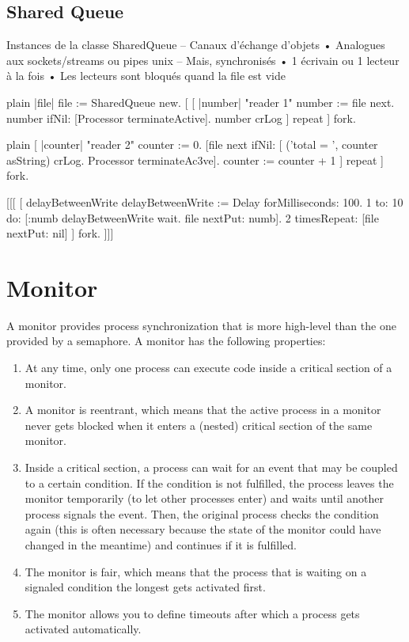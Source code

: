 \documentclass[10pt,twoside,english]{_support/latex/sbabook/sbabook}
\begin{document}
\section{Shared Queue}
Instances de la classe SharedQueue  –  Canaux d'échange d'objets 
•  Analogues aux sockets/streams ou pipes unix  –  Mais, synchronisés 
•  1 écrivain ou 1 lecteur à la fois 
•  Les lecteurs sont bloqués quand la file est vide

\begin{displaycode}{plain}
|file| 
file := SharedQueue new.
[
	[ |number| "reader 1"
	number := file next.
	number ifNil: [Processor terminateActive].
	number crLog ] repeat
	] fork. 
\end{displaycode}

\begin{displaycode}{plain}
	[ |counter| "reader 2" 
	counter := 0. 
	[file next ifNil: [ ('total = ', counter asString) crLog.
		Processor terminateAc3ve].
		counter := counter + 1 ] repeat 
	] fork.
\end{displaycode}

 {[}{[}{[}
{[}	
	\textbar{}delayBetweenWrite\textbar{}
	delayBetweenWrite := Delay forMilliseconds: 100.   
	1 to: 10 do: {[}:numb\textbar{} 
		delayBetweenWrite wait.
		file nextPut: numb{]}.
	2 timesRepeat: {[}file nextPut: nil{]}
	{]} fork. 
{]}{]}{]}
\chapter{Monitor}
A monitor provides process synchronization that is more high-level than the one provided by a semaphore. A monitor has the following properties:

\begin{enumerate}
\item At any time, only one process can execute code inside a critical section of a monitor.
\item A monitor is reentrant, which means that the active process in a monitor never gets blocked when it enters a (nested) critical section of the same monitor.
\item Inside a critical section, a process can wait for an event that may be coupled to a certain condition. If the condition is not fulfilled, the process leaves the monitor temporarily (to let other processes enter) and waits until another process signals the event. Then, the original process checks the condition again (this is often necessary because the state of the monitor could have changed in the meantime) and continues if it is fulfilled.
\item The monitor is fair, which means that the process that is waiting on a signaled condition the longest gets activated first.
\item The monitor allows you to define timeouts after which a process gets activated automatically.
\end{enumerate}
\end{document}
